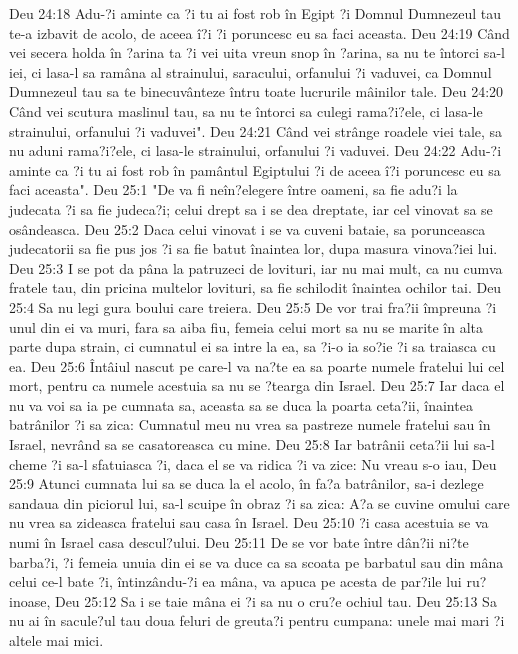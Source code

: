 Deu 24:18  Adu-?i aminte ca ?i tu ai fost rob în Egipt ?i Domnul Dumnezeul tau te-a izbavit de acolo, de aceea î?i ?i poruncesc eu sa faci aceasta.
Deu 24:19  Când vei secera holda în ?arina ta ?i vei uita vreun snop în ?arina, sa nu te întorci sa-l iei, ci lasa-l sa ramâna al strainului, saracului, orfanului ?i vaduvei, ca Domnul Dumnezeul tau sa te binecuvânteze întru toate lucrurile mâinilor tale.
Deu 24:20  Când vei scutura maslinul tau, sa nu te întorci sa culegi rama?i?ele, ci lasa-le strainului, orfanului ?i vaduvei".
Deu 24:21  Când vei strânge roadele viei tale, sa nu aduni rama?i?ele, ci lasa-le strainului, orfanului ?i vaduvei.
Deu 24:22  Adu-?i aminte ca ?i tu ai fost rob în pamântul Egiptului ?i de aceea î?i poruncesc eu sa faci aceasta".
Deu 25:1  "De va fi neîn?elegere între oameni, sa fie adu?i la judecata ?i sa fie judeca?i; celui drept sa i se dea dreptate, iar cel vinovat sa se osândeasca.
Deu 25:2  Daca celui vinovat i se va cuveni bataie, sa porunceasca judecatorii sa fie pus jos ?i sa fie batut înaintea lor, dupa masura vinova?iei lui.
Deu 25:3  I se pot da pâna la patruzeci de lovituri, iar nu mai mult, ca nu cumva fratele tau, din pricina multelor lovituri, sa fie schilodit înaintea ochilor tai.
Deu 25:4  Sa nu legi gura boului care treiera.
Deu 25:5  De vor trai fra?ii împreuna ?i unul din ei va muri, fara sa aiba fiu, femeia celui mort sa nu se marite în alta parte dupa strain, ci cumnatul ei sa intre la ea, sa ?i-o ia so?ie ?i sa traiasca cu ea.
Deu 25:6  Întâiul nascut pe care-l va na?te ea sa poarte numele fratelui lui cel mort, pentru ca numele acestuia sa nu se ?tearga din Israel.
Deu 25:7  Iar daca el nu va voi sa ia pe cumnata sa, aceasta sa se duca la poarta ceta?ii, înaintea batrânilor ?i sa zica: Cumnatul meu nu vrea sa pastreze numele fratelui sau în Israel, nevrând sa se casatoreasca cu mine.
Deu 25:8  Iar batrânii ceta?ii lui sa-l cheme ?i sa-l sfatuiasca ?i, daca el se va ridica ?i va zice: Nu vreau s-o iau,
Deu 25:9  Atunci cumnata lui sa se duca la el acolo, în fa?a batrânilor, sa-i dezlege sandaua din piciorul lui, sa-l scuipe în obraz ?i sa zica: A?a se cuvine omului care nu vrea sa zideasca fratelui sau casa în Israel.
Deu 25:10  ?i casa acestuia se va numi în Israel casa descul?ului.
Deu 25:11  De se vor bate între dân?ii ni?te barba?i, ?i femeia unuia din ei se va duce ca sa scoata pe barbatul sau din mâna celui ce-l bate ?i, întinzându-?i ea mâna, va apuca pe acesta de par?ile lui ru?inoase,
Deu 25:12  Sa i se taie mâna ei ?i sa nu o cru?e ochiul tau.
Deu 25:13  Sa nu ai în sacule?ul tau doua feluri de greuta?i pentru cumpana: unele mai mari ?i altele mai mici.
